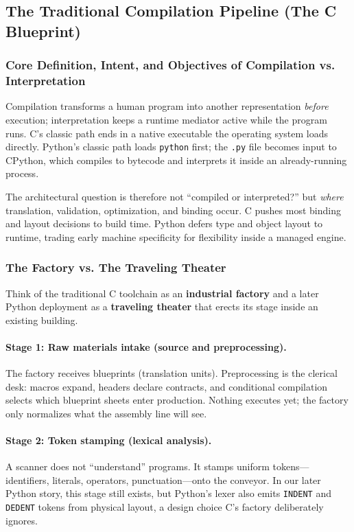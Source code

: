 \subsection{The Traditional Compilation Pipeline (The C Blueprint)}

\subsubsection{Core Definition, Intent, and Objectives of Compilation vs. Interpretation}

Compilation transforms a human program into another representation \emph{before} execution; interpretation keeps a runtime mediator active while the program runs. C's classic path ends in a native executable the operating system loads directly. Python's classic path loads \texttt{python} first; the \texttt{.py} file becomes input to CPython, which compiles to bytecode and interprets it inside an already-running process.

The architectural question is therefore not ``compiled or interpreted?'' but \emph{where} translation, validation, optimization, and binding occur. C pushes most binding and layout decisions to build time. Python defers type and object layout to runtime, trading early machine specificity for flexibility inside a managed engine.

\subsubsection{The Factory vs. The Traveling Theater}

Think of the traditional C toolchain as an \textbf{industrial factory} and a later Python deployment as a \textbf{traveling theater} that erects its stage inside an existing building.

\paragraph{Stage 1: Raw materials intake (source and preprocessing).}
The factory receives blueprints (translation units). Preprocessing is the clerical desk: macros expand, headers declare contracts, and conditional compilation selects which blueprint sheets enter production. Nothing executes yet; the factory only normalizes what the assembly line will see.

\paragraph{Stage 2: Token stamping (lexical analysis).}
A scanner does not ``understand'' programs. It stamps uniform tokens---identifiers, literals, operators, punctuation---onto the conveyor. In our later Python story, this stage still exists, but Python's lexer also emits \texttt{INDENT} and \texttt{DEDENT} tokens from physical layout, a design choice C's factory deliberately ignores.

